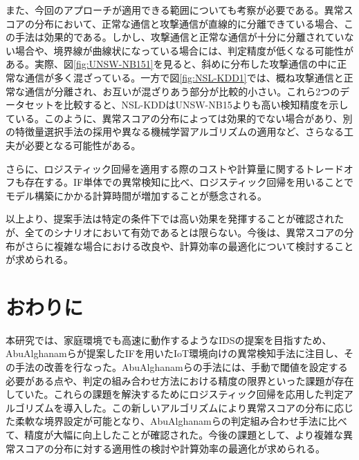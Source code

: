 \documentclass{css}
\begin{document}
また、今回のアプローチが適用できる範囲についても考察が必要である。異常スコアの分布において、正常な通信と攻撃通信が直線的に分離できている場合、この手法は効果的である。しかし、攻撃通信と正常な通信が十分に分離されていない場合や、境界線が曲線状になっている場合には、判定精度が低くなる可能性がある。実際、図\ref{fig:UNSW-NB151}を見ると、斜めに分布した攻撃通信の中に正常な通信が多く混ざっている。一方で図\ref{fig:NSL-KDD1}では、概ね攻撃通信と正常な通信が分離され、お互いが混ざりあう部分が比較的小さい。これら2つのデータセットを比較すると、NSL-KDDはUNSW-NB15よりも高い検知精度を示している。このように、異常スコアの分布によっては効果的でない場合があり、別の特徴量選択手法の採用や異なる機械学習アルゴリズムの適用など、さらなる工夫が必要となる可能性がある。

さらに、ロジスティック回帰を適用する際のコストや計算量に関するトレードオフも存在する。IF単体での異常検知に比べ、ロジスティック回帰を用いることでモデル構築にかかる計算時間が増加することが懸念される。

以上より、提案手法は特定の条件下では高い効果を発揮することが確認されたが、全てのシナリオにおいて有効であるとは限らない。今後は、異常スコアの分布がさらに複雑な場合における改良や、計算効率の最適化について検討することが求められる。

\section{おわりに}
本研究では、家庭環境でも高速に動作するようなIDSの提案を目指すため、AbuAlghanamらが提案したIFを用いたIoT環境向けの異常検知手法\cite{AbuAlghanam2023-sx}に注目し、その手法の改善を行なった。AbuAlghanamらの手法には、手動で閾値を設定する必要がある点や、判定の組み合わせ方法における精度の限界といった課題が存在していた。これらの課題を解決するためにロジスティック回帰を応用した判定アルゴリズムを導入した。この新しいアルゴリズムにより異常スコアの分布に応じた柔軟な境界設定が可能となり、AbuAlghanamらの判定組み合わせ手法に比べて、精度が大幅に向上したことが確認された。今後の課題として、より複雑な異常スコアの分布に対する適用性の検討や計算効率の最適化が求められる。


\end{document}
